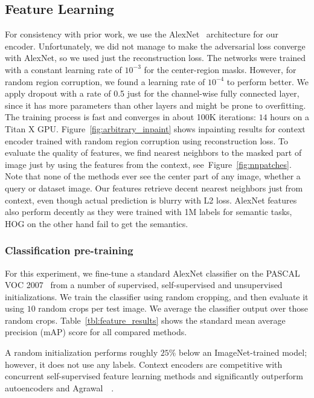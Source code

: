 \documentclass[10pt,twocolumn,letterpaper]{article}
\newcommand{\reffig}[1]{Figure~\ref{fig:#1}}
\newcommand{\reftbl}[1]{Table~\ref{tbl:#1}}
\newcommand{\lblsec}[1]{\label{sec:#1}}
\begin{document}
\subsection{Feature Learning}
\lblsec{feature}
For consistency with prior work, we use the AlexNet~\cite{krizhevsky2012imagenet} architecture for our encoder.
Unfortunately, we did not manage to make the adversarial loss converge with AlexNet, so we used just the reconstruction loss.
The networks were trained with a constant learning rate of $10^{-3}$ for the center-region masks.
However, for random region corruption, we found a learning rate of $10^{-4}$ to perform better.
We apply dropout with a rate of 0.5 just for the channel-wise fully connected layer, since it has more parameters than other layers and might be prone to overfitting.
The training process is fast and converges in about 100K iterations: $14$ hours on a Titan X GPU.
\reffig{arbitrary_inpaint} shows inpainting results for context encoder trained with random region corruption using reconstruction loss.
To evaluate the quality of features, we find nearest neighbors to the masked part of image just by using the features from the context, see~\reffig{nnpatches}.
Note that none of the methods ever see the center part of any image, whether a query or dataset image.
Our features retrieve decent nearest neighbors just from context, even though actual prediction is blurry with L2 loss.
AlexNet features also perform decently as they were trained with 1M labels for semantic tasks, HOG on the other hand fail to get the semantics.

\subsubsection{Classification pre-training}
\label{sec:class}
For this experiment, we fine-tune a standard AlexNet classifier on the PASCAL VOC 2007~\cite{everingham2014pascal} from a number of supervised, self-supervised and unsupervised initializations.
We train the classifier using random cropping, and then evaluate it using $10$ random crops per test image.
We average the classifier output over those random crops.
\reftbl{feature_results} shows the standard mean average precision (mAP) score for all compared methods.

A random initialization performs roughly $25\%$ below an ImageNet-trained model; however, it does not use any labels.
Context encoders are competitive with concurrent self-supervised feature learning methods \cite{doersch2015unsupervised,wang2015unsupervised} and significantly outperform autoencoders and Agrawal~\etal~\cite{agrawal2015learning}.
\end{document}
